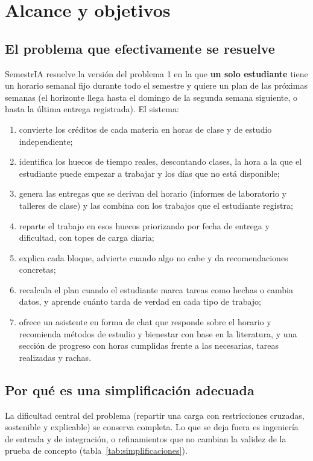 \section{Alcance y objetivos}\label{sec:alcance}

\subsection{El problema que efectivamente se resuelve}

SemestrIA resuelve la versión del problema 1 en la que \textbf{un solo estudiante} tiene un horario semanal fijo durante todo el semestre y quiere un plan de las próximas semanas (el horizonte llega hasta el domingo de la segunda semana siguiente, o hasta la última entrega registrada). El sistema:

\begin{enumerate}
    \item convierte los créditos de cada materia en horas de clase y de estudio independiente;
    \item identifica los huecos de tiempo reales, descontando clases, la hora a la que el estudiante puede empezar a trabajar y los días que no está disponible;
    \item genera las entregas que se derivan del horario (informes de laboratorio y talleres de clase) y las combina con los trabajos que el estudiante registra;
    \item reparte el trabajo en esos huecos priorizando por fecha de entrega y dificultad, con topes de carga diaria;
    \item explica cada bloque, advierte cuando algo no cabe y da recomendaciones concretas;
    \item recalcula el plan cuando el estudiante marca tareas como hechas o cambia datos, y aprende cuánto tarda de verdad en cada tipo de trabajo;
    \item ofrece un asistente en forma de chat que responde sobre el horario y recomienda métodos de estudio y bienestar con base en la literatura, y una sección de progreso con horas cumplidas frente a las necesarias, tareas realizadas y rachas.
\end{enumerate}

\subsection{Por qué es una simplificación adecuada}

La dificultad central del problema (repartir una carga con restricciones cruzadas, sostenible y explicable) se conserva completa. Lo que se deja fuera es ingeniería de entrada y de integración, o refinamientos que no cambian la validez de la prueba de concepto (tabla~\ref{tab:simplificaciones}).

